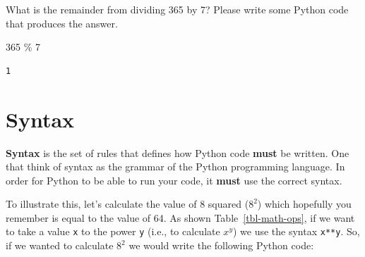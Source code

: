 \documentclass[
  letterpaper,
  DIV=11,
  numbers=noendperiod]{scrreprt}
\newenvironment{Shaded}{\begin{snugshade}}{\end{snugshade}}
\newcommand{\DecValTok}[1]{\textcolor[rgb]{0.68,0.00,0.00}{#1}}
\newcommand{\OperatorTok}[1]{\textcolor[rgb]{0.37,0.37,0.37}{#1}}
\begin{document}
\begin{tcolorbox}[enhanced jigsaw, colframe=quarto-callout-tip-color-frame, toprule=.15mm, left=2mm, breakable, colbacktitle=quarto-callout-tip-color!10!white, arc=.35mm, opacityback=0, colback=white, leftrule=.75mm, title=\textcolor{quarto-callout-tip-color}{\faLightbulb}\hspace{0.5em}{Exercise}, bottomrule=.15mm, bottomtitle=1mm, toptitle=1mm, titlerule=0mm, rightrule=.15mm, opacitybacktitle=0.6, coltitle=black]

What is the remainder from dividing 365 by 7? Please write some Python
code that produces the answer.

\end{tcolorbox}

\begin{tcolorbox}[enhanced jigsaw, colframe=quarto-callout-note-color-frame, toprule=.15mm, left=2mm, breakable, colbacktitle=quarto-callout-note-color!10!white, arc=.35mm, opacityback=0, colback=white, leftrule=.75mm, title=\textcolor{quarto-callout-note-color}{\faInfo}\hspace{0.5em}{Solution}, bottomrule=.15mm, bottomtitle=1mm, toptitle=1mm, titlerule=0mm, rightrule=.15mm, opacitybacktitle=0.6, coltitle=black]

\begin{Shaded}
\begin{Highlighting}[]
\DecValTok{365} \OperatorTok{\%} \DecValTok{7}
\end{Highlighting}
\end{Shaded}

\begin{verbatim}
1
\end{verbatim}

\end{tcolorbox}

\section{Syntax}\label{syntax}

\textbf{Syntax} is the set of rules that defines how Python code
\textbf{must} be written. One that think of syntax as the grammar of the
Python programming language. In order for Python to be able to run your
code, it \textbf{must} use the correct syntax.

To illustrate this, let's calculate the value of 8 squared (\(8^2\))
which hopefully you remember is equal to the value of 64. As shown
Table~\ref{tbl-math-ops}, if we want to take a value \texttt{x} to the
power \texttt{y} (i.e., to calculate \(x^y\)) we use the syntax
\texttt{x**y}. So, if we wanted to calculate \(8^2\) we would write the
following Python code:
\end{document}
